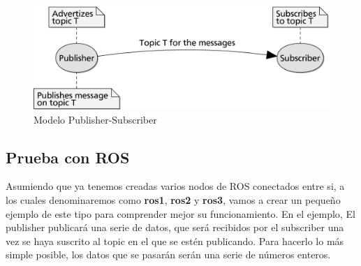 	\begin{figure}[H]
		\centering
		\includegraphics[width=1.0\textwidth]{figuras/ros-pub-sub}
		\caption{Modelo Publisher-Subscriber}
		\label{fig:ros-pub-sub}
	\end{figure}
	
		\subsection{Prueba con ROS}
		Asumiendo que ya tenemos creadas varios nodos de ROS conectados entre si, a los cuales denominaremos como \textbf{ros1}, \textbf{ros2} y \textbf{ros3}, vamos a crear un pequeño ejemplo de este tipo para comprender mejor su funcionamiento. En el ejemplo, El publisher publicará una serie de datos, que será recibidos por el subscriber una vez se haya suscrito al topic en el que se estén publicando. Para hacerlo lo más simple posible, los datos que se pasarán serán una serie de números enteros.
		
		